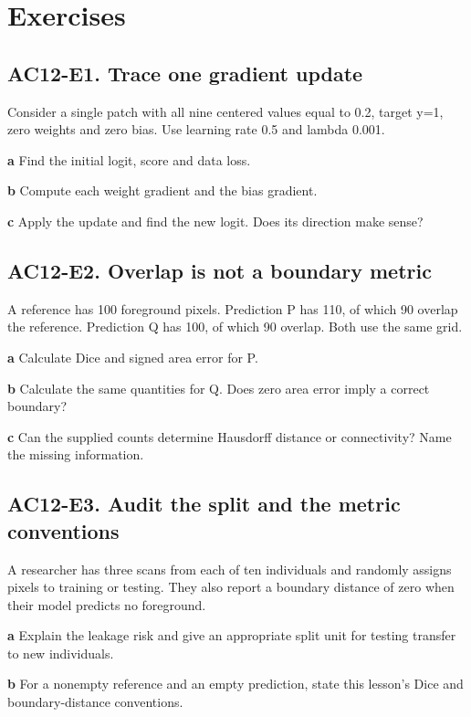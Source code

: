 \documentclass[11pt,letterpaper]{article}
\theoremstyle{definition}\newtheorem{definition}{Definition}\newtheorem{example}{Example}
\numberwithin{equation}{section}
\begin{document}
\section*{Exercises}
\par\noindent\begin{minipage}{\linewidth}
\subsection*{AC12-E1. Trace one gradient update}
Consider a single patch with all nine centered values equal to 0.2, target y=\allowbreak{}1, zero weights and zero bias. Use learning rate 0.5 and lambda 0.001.

\textbf{a} Find the initial logit, score and data loss.

\end{minipage}\par\medskip
\textbf{b} Compute each weight gradient and the bias gradient.

\textbf{c} Apply the update and find the new logit. Does its direction make sense?

\par\noindent\begin{minipage}{\linewidth}
\subsection*{AC12-E2. Overlap is not a boundary metric}
A reference has 100 foreground pixels. Prediction P has 110, of which 90 overlap the reference. Prediction Q has 100, of which 90 overlap. Both use the same grid.

\textbf{a} Calculate Dice and signed area error for P.

\end{minipage}\par\medskip
\textbf{b} Calculate the same quantities for Q. Does zero area error imply a correct boundary?

\textbf{c} Can the supplied counts determine Hausdorff distance or connectivity? Name the missing information.

\par\noindent\begin{minipage}{\linewidth}
\subsection*{AC12-E3. Audit the split and the metric conventions}
A researcher has three scans from each of ten individuals and randomly assigns pixels to training or testing. They also report a boundary distance of zero when their model predicts no foreground.

\textbf{a} Explain the leakage risk and give an appropriate split unit for testing transfer to new individuals.

\end{minipage}\par\medskip
\textbf{b} For a nonempty reference and an empty prediction, state this lesson's Dice and boundary-distance conventions.
\end{document}
